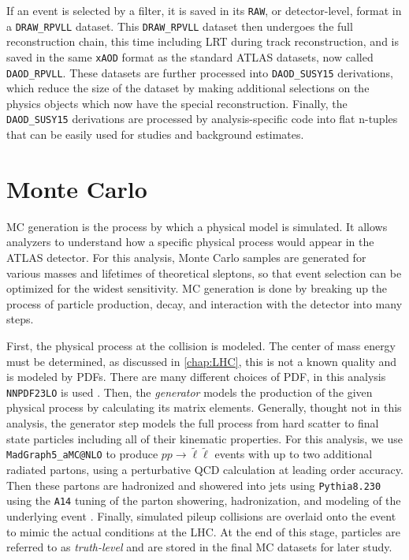 If an event is selected by a filter, it is saved in its \texttt{RAW}, or detector-level, format in a \texttt{DRAW\_RPVLL} dataset. This \texttt{DRAW\_RPVLL} dataset then undergoes the full reconstruction chain, this time including \ac{LRT} during track reconstruction, and is saved in the same \texttt{xAOD} format as the standard \ac{ATLAS} datasets, now called \texttt{DAOD\_RPVLL}. These datasets are further processed into \texttt{DAOD\_SUSY15} derivations, which reduce the size of the dataset by making additional selections on the physics objects which now have the special reconstruction. Finally, the \texttt{DAOD\_SUSY15} derivations are processed by analysis-specific code into flat n-tuples that can be easily used for studies and background estimates. 

\section{Monte Carlo}

\ac{MC} generation is the process by which a physical model is simulated. It allows analyzers to understand how a specific physical process would appear in the \ac{ATLAS} detector. For this analysis, Monte Carlo samples are generated for various masses and lifetimes of theoretical sleptons, so that event selection can be optimized for the widest sensitivity. MC generation is done by breaking up the process of particle production, decay, and interaction with the detector into many steps. 


First, the physical process at the collision is modeled. The center of mass energy must be determined, as discussed in \autoref{chap:LHC}, this is not a known quality and is modeled by \ac{PDF}s. There are many different choices of \ac{PDF}, in this analysis \texttt{NNPDF23LO} is used \cite{pdfs} . Then, the \emph{generator} models the production of the given physical process by calculating its matrix elements. Generally, thought not in this analysis, the generator step models the full process from hard scatter to final state particles including all of their kinematic properties. For this analysis, we use \texttt{MadGraph5\_aMC@NLO} \cite{madgraph} to produce $pp \rightarrow \tilde{\ell}\tilde{\ell}$ events with up to two additional radiated partons, using a perturbative \ac{QCD} calculation at leading order accuracy. Then these partons are hadronized and showered into jets using \texttt{Pythia8.230} using the \texttt{A14} tuning of the parton showering, hadronization, and modeling of the underlying event \cite{atlas-pythia}. Finally, simulated pileup collisions are overlaid onto the event to mimic the actual conditions at the \ac{LHC}. At the end of this stage, particles are referred to as \emph{truth-level} and are stored in the final \ac{MC} datasets for later study.

